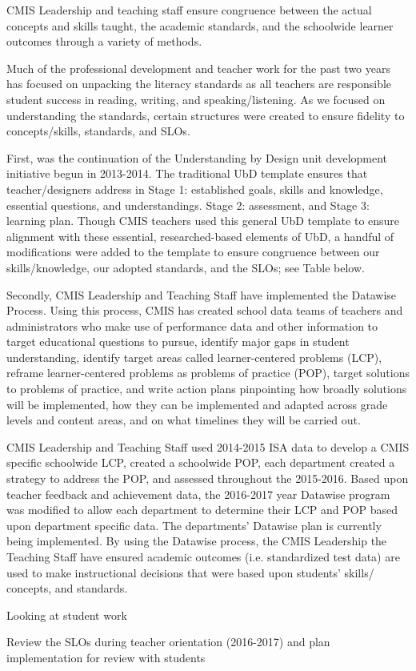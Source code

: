 \documentclass{report}
\begin{document}
\begin{findings}

CMIS Leadership and teaching staff ensure congruence between the actual concepts and skills taught, the academic standards, and the schoolwide learner outcomes through a variety of methods. 

Much of the professional development and teacher work for the past two years has focused on unpacking the literacy standards as all teachers are responsible student success in reading, writing, and speaking/listening. As we focused on understanding the standards, certain structures were created to ensure fidelity to concepts/skills, standards, and SLOs.

First, was the continuation of the Understanding by Design unit development initiative begun in 2013-2014. The traditional UbD template ensures that teacher/designers address in Stage 1: established goals, skills and knowledge, essential questions, and understandings. Stage 2: assessment, and Stage 3: learning plan. Though CMIS teachers used this general UbD template to ensure alignment with these essential, researched-based elements of UbD, a handful of modifications were added to the template to ensure congruence between our skills/knowledge, our adopted standards, and the SLOs; see Table below. 

Secondly, CMIS Leadership and Teaching Staff have implemented the Datawise Process. Using this process, CMIS has created school data teams of teachers and administrators who make use of performance data and other information to target educational questions to pursue, identify major gaps in student understanding, identify target areas called learner-centered problems (LCP), reframe learner-centered problems as problems of practice (POP), target solutions to problems of practice, and write action plans pinpointing how broadly solutions will be implemented, how they can be implemented and adapted across grade levels and content areas, and on what timelines they will be carried out. 

CMIS Leadership and Teaching Staff used 2014-2015 ISA data to develop a CMIS specific schoolwide LCP, created a schoolwide POP, each department created a strategy to address the POP, and assessed throughout the 2015-2016. Based upon teacher feedback and achievement data, the 2016-2017 year Datawise program was modified to allow each department to determine their LCP and POP based upon department specific data. The departments' Datawise plan is currently being implemented. By using the Datawise process, the CMIS Leadership the Teaching Staff have ensured academic outcomes (i.e. standardized test data) are used to make instructional decisions that were based upon students' skills/ concepts, and standards. 

Looking at student work

Review the SLOs during teacher orientation (2016-2017) and plan implementation for review with students 

\end{findings}
\end{document}

